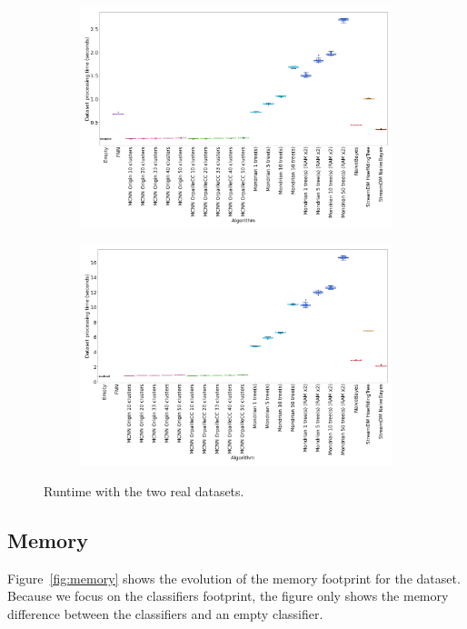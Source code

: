 \begin{figure}
	\begin{subfigure}[t]{.49\linewidth}
		\includegraphics[width=\linewidth]{figures/results/banos_6_runtime.png}
		\caption{\banosdataset}
		\label{fig:runtime-banos}
	\end{subfigure}
	\hfill
	\begin{subfigure}[t]{.49\linewidth}
		\includegraphics[width=\linewidth]{figures/results/recofit_6_runtime.png}
		\caption{\recofitdataset}
		\label{fig:runtime-recofit}
	\end{subfigure}
	\caption{Runtime with the two real datasets.}
	\label{fig:runtime}
\end{figure}

\subsection{Memory}
\label{sec:result-memory}
Figure~\ref{fig:memory} shows the evolution of the memory footprint for the
\banosdataset dataset. Because we focus on the classifiers footprint, the
figure only shows the memory difference between the classifiers and an empty
classifier. 

